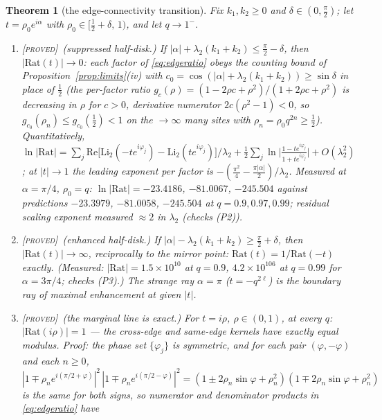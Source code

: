 \documentclass[11pt,a4paper]{article}
\newcommand{\PROVED}{{\color{ForestGreen}\textsc{[proved]}}}
\theoremstyle{definition}
\theoremstyle{plain}
\newtheorem{theorem}[definition]{Theorem}
\begin{document}
\begin{theorem}[the edge-connectivity transition]\label{thm:transition}
Fix $k_{1},k_{2}\ge0$ and $\delta\in(0,\tfrac\pi2)$; let $t=\rho_{0}e^{i\alpha}$ with
$\rho_{0}\in[\tfrac12+\delta,\,1)$, and let $q\to1^{-}$.
\begin{enumerate}[label=(\roman*)]
\item \PROVED\ \emph{(suppressed half-disk.)} If $|\alpha|+\lambda_2(k_{1}+k_{2})\le
\tfrac\pi2-\delta$, then $|\mathrm{Rat}(t)|\to0$: each factor of \eqref{eq:edgeratio} obeys
the counting bound of Proposition~\ref{prop:limits}(iv) with
$c_{0}=\cos(|\alpha|+\lambda_2(k_1{+}k_2))\ge\sin\delta$ in place of $\tfrac12$ (the
per-factor ratio $g_{c}(\rho)=(1-2\rho c+\rho^{2})/(1+2\rho c+\rho^{2})$ is decreasing in
$\rho$ for $c>0$, derivative numerator $2c(\rho^{2}-1)<0$, so $g_{c_0}(\rho_{n})\le
g_{c_0}(\tfrac12)<1$ on the $\to\infty$ many sites with $\rho_{n}=\rho_{0}q^{2n}\ge\tfrac12$).
Quantitatively, $\ln|\mathrm{Rat}|=\sum_{j}\mathrm{Re}\bigl[\mathrm{Li}_2(-te^{i\varphi_j})
-\mathrm{Li}_2(te^{i\varphi_j})\bigr]/\lambda_2+\tfrac12\sum_{j}
\ln\bigl|\tfrac{1-te^{i\varphi_j}}{1+te^{i\varphi_j}}\bigr|+O(\lambda_2^{2})$; at
$|t|\to1$ the leading exponent per factor is $-(\tfrac{\pi^{2}}{4}-\tfrac{\pi|\alpha|}{2})
/\lambda_2$. Measured at $\alpha=\pi/4$, $\rho_0=q$: $\ln|\mathrm{Rat}|=-23.4186$, $-81.0067$,
$-245.504$ against predictions $-23.3979$, $-81.0058$, $-245.504$ at $q=0.9,0.97,0.99$;
residual scaling exponent measured $\approx2$ in $\lambda_2$ (checks (P2)).
\item \PROVED\ \emph{(enhanced half-disk.)} If $|\alpha|-\lambda_2(k_1{+}k_2)\ge\tfrac\pi2
+\delta$, then $|\mathrm{Rat}(t)|\to\infty$, reciprocally to the mirror point:
$\mathrm{Rat}(t)=1/\mathrm{Rat}(-t)$ exactly. (Measured: $|\mathrm{Rat}|=1.5\times10^{10}$
at $q=0.9$, $4.2\times10^{106}$ at $q=0.99$ for $\alpha=3\pi/4$; checks (P3).) The strange
ray $\alpha=\pi$ ($t=-q^{2\ell}$) is the boundary ray of maximal enhancement at given
$|t|$.
\item \PROVED\ \emph{(the marginal line is exact.)} For $t=i\rho$, $\rho\in(0,1)$,
\emph{at every} $q$:
$|\mathrm{Rat}(i\rho)|=1$ --- the cross-edge and same-edge kernels have exactly equal
modulus. Proof: the phase set $\{\varphi_{j}\}$ is symmetric, and for each pair
$(\varphi,-\varphi)$ and each $n\ge0$,
$|1\mp\rho_{n}e^{i(\pi/2+\varphi)}|^{2}\,|1\mp\rho_{n}e^{i(\pi/2-\varphi)}|^{2}
=(1\pm2\rho_{n}\sin\varphi+\rho_{n}^{2})(1\mp2\rho_{n}\sin\varphi+\rho_{n}^{2})$ is the
same for both signs, so numerator and denominator products in \eqref{eq:edgeratio} have

\end{enumerate}
\end{theorem}
\end{document}
